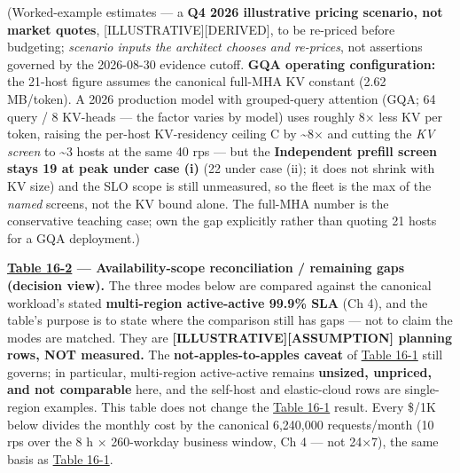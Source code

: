 (Worked-example estimates --- a \textbf{Q4 2026 illustrative pricing
scenario, not market quotes}, \mbox{{[}ILLUSTRATIVE{]}}\hspace{0pt}\mbox{{[}DERIVED{]}}, to be
re-priced before budgeting; \emph{scenario inputs the architect chooses
and re-prices}, not assertions governed by the 2026-08-30 evidence
cutoff. \textbf{GQA operating configuration:} the 21-host figure assumes
the canonical full-MHA KV constant (2.62 MB/token). A 2026 production
model with grouped-query attention (GQA; 64 query / 8 KV-heads --- the
factor varies by model) uses roughly 8× less KV per token, raising the
per-host KV-residency ceiling C by \textasciitilde8× and cutting the
\emph{KV screen} to \textasciitilde3 hosts at the same 40 rps --- but
the \textbf{Independent prefill screen stays 19 at peak under case (i)}
(22 under case (ii); it does not shrink with KV size) and the SLO scope
is still unmeasured, so the fleet is the max of the \emph{named}
screens, not the KV bound alone. The full-MHA number is the conservative
teaching case; own the gap explicitly rather than quoting 21 hosts for a
GQA deployment.)


\textbf{\hyperref[tab:16.2]{Table 16-2} --- Availability-scope reconciliation / remaining
gaps (decision view).} The three modes below are compared against the
canonical workload's stated \textbf{multi-region active-active 99.9\%
SLA} (Ch 4), and the table's purpose is to state where the comparison
still has gaps --- not to claim the modes are matched. They are
\textbf{\mbox{{[}ILLUSTRATIVE{]}}\hspace{0pt}\mbox{{[}ASSUMPTION{]}} planning rows, NOT measured.}
The \textbf{not-apples-to-apples caveat} of \hyperref[tab:16.1]{Table 16-1} still governs; in
particular, multi-region active-active remains \textbf{unsized,
unpriced, and not comparable} here, and the self-host and elastic-cloud
rows are single-region examples. This table does not change the \hyperref[tab:16.1]{Table 16-1} result. Every \$/1K below divides the monthly cost by the canonical
6,240,000 requests/month (10 rps over the 8 h × 260-workday business
window, Ch 4 --- not 24×7), the same basis as \hyperref[tab:16.1]{Table 16-1}.

